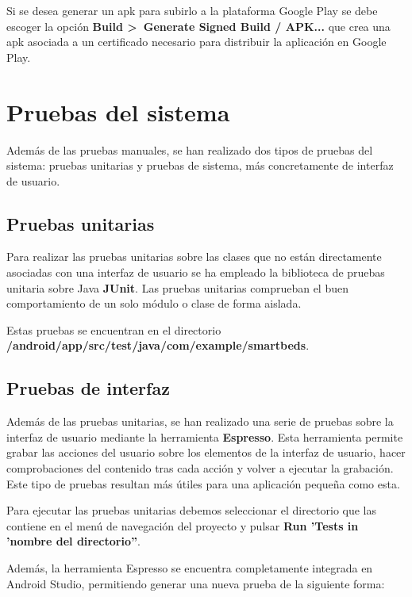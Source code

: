Si se desea generar un apk para subirlo a la plataforma Google Play se debe escoger la opción \textbf{Build >~Generate Signed Build / APK...} que crea una apk asociada a un certificado necesario para distribuir la aplicación en Google Play. 

\section{Pruebas del sistema}

Además de las pruebas manuales, se han realizado dos tipos de pruebas del sistema: pruebas unitarias y pruebas de sistema, más concretamente de interfaz de usuario. 

\subsection{Pruebas unitarias} 

Para realizar las pruebas unitarias sobre las clases que no están directamente asociadas con una interfaz de usuario se ha empleado la biblioteca de pruebas unitaria sobre Java \textbf{JUnit}. Las pruebas unitarias comprueban el buen comportamiento de un solo módulo o clase de forma aislada.

Estas pruebas se encuentran en el directorio \\ \textbf{/android/app/src/test/java/com/example/smartbeds}. 

\subsection{Pruebas de interfaz}

Además de las pruebas unitarias, se han realizado una serie de pruebas sobre la interfaz de usuario mediante la herramienta \textbf{Espresso}. Esta herramienta permite grabar las acciones del usuario sobre los elementos de la interfaz de usuario, hacer comprobaciones del contenido tras cada acción y volver a ejecutar la grabación. Este tipo de pruebas resultan más útiles para una aplicación pequeña como esta. 

Para ejecutar las pruebas unitarias debemos seleccionar el directorio que las contiene en el menú de navegación del proyecto y pulsar \textbf{Run 'Tests in 'nombre del directorio''}. 

Además, la herramienta Espresso se encuentra completamente integrada en Android Studio, permitiendo generar una nueva prueba de la siguiente forma:

